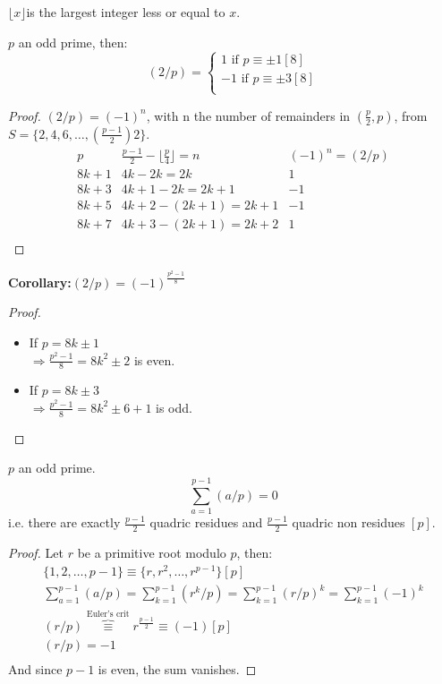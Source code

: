 \documentclass{report}
\begin{document}
\begin{defi}$\lfloor x \rfloor$is the largest integer less or equal to $x$.\end{defi}
\begin{thm} $p$ an odd prime, then:
						\[(2/p)=\left \{
										\begin{array}{lcl}
										1 \text{ if } p\equiv \pm 1[8]\\
										-1 \text{ if } p\equiv \pm 3[8]\\
										\end{array}
										\right.\]
\end{thm}
\begin{proof}$(2/p)=(-1)^n$, with n the number of remainders in $(\frac{p}{2},p)$, from $S=\{2,4,6,\dots,(\frac{p-1}{2})2\}$.
							\[\begin{array}{l|c|c}
							p&\frac{p-1}{2}-\lfloor \frac{p}{4} \rfloor = n &(-1)^n=(2/p)\\
							\hline
							8k+1 & 4k-2k=2k & 1 \\
							8k+3 & 4k+1-2k=2k+1 & -1\\
							8k+5 & 4k+2-(2k+1)=2k+1&-1\\
							8k+7 & 4k+3-(2k+1)=2k+2&1\\
							\end{array}\]
\end{proof}
\textbf{Corollary:}$(2/p)=(-1)^\frac{p^2-1}{8}$
\begin{proof} \hspace{3mm}\\ \begin{itemize}
							\item If $p=8k\pm 1$\\
										$\Rightarrow \frac{p^2-1}{8}=8k^2\pm 2$ is even.
							\item If $p=8k\pm 3$\\
										$\Rightarrow \frac{p^2-1}{8}=8k^2\pm 6+1$ is odd.
							\end{itemize}
\end{proof}
\begin{thm}$p$ an odd prime.
						\[\sum_{a=1}^{p-1} (a/p)=0\]
						i.e. there are exactly $\frac{p-1}{2}$ quadric residues and $\frac{p-1}{2}$ quadric non residues $[p]$.\\
\end{thm}
\begin{proof} Let $r$ be a primitive root modulo $p$, then:
							\[\begin{array}{lcl}
											\{1,2,\dots,p-1\}\equiv\{r,r^2,\dots,r^{p-1}\}[p]\\
											\sum_{a=1}^{p-1} (a/p)=\sum_{k=1}^{p-1} (r^k/p)=\sum_{k=1}^{p-1} (r/p)^k=\sum_{k=1}^{p-1}(-1)^k\\
											(r/p)\overbrace{\equiv}^{\scriptscriptstyle \text{Euler's crit}} r^\frac{p-1}{2}\equiv (-1)[p]\\
											(r/p)=-1\\
								\end{array}\]
							And since $p-1$ is even, the sum vanishes.
\end{proof}
\end{document}
